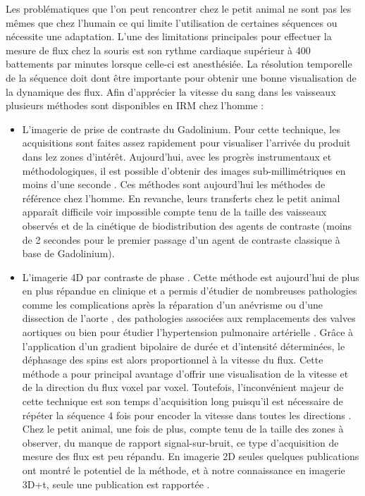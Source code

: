 Les problématiques que l'on peut rencontrer chez le petit animal ne sont pas les mêmes que chez l'humain ce qui limite l'utilisation de certaines séquences ou nécessite une adaptation. L'une des limitations principales pour effectuer la mesure de flux chez la souris est son rythme cardiaque supérieur à 400 battements par minutes lorsque celle-ci est anesthésiée. La résolution temporelle de la séquence doit dont être importante pour obtenir une bonne visualisation de la dynamique des flux. Afin d’apprécier la vitesse du sang dans les vaisseaux plusieurs méthodes sont disponibles en IRM chez l’homme : 
\begin{itemize}
\item L’imagerie de prise de contraste du Gadolinium. Pour cette technique, les acquisitions sont faites assez rapidement pour visualiser l’arrivée du produit dans lez zones d’intérêt. Aujourd’hui, avec les progrès instrumentaux et méthodologiques, il est possible d’obtenir des images sub-millimétriques en moins d’une seconde \cite{Wu:2011ys}. Ces méthodes sont aujourd’hui les méthodes de référence chez l’homme. En revanche, leurs transferts chez le petit animal apparaît difficile voir impossible compte tenu de la taille des vaisseaux observés et de la cinétique de biodistribution des agents de contraste (moins de 2 secondes pour le premier passage d’un agent de contraste classique à base de Gadolinium).

\item L’imagerie 4D par contraste de phase \cite{Markl:2012pi}. Cette méthode est aujourd’hui de plus en plus répandue en clinique et a permis d’étudier de nombreuses pathologies comme les complications après la réparation d'un anévrisme ou d'une dissection de l'aorte \cite{frydrychowicz2011aortic} , des pathologies associées aux remplacements des valves aortiques \cite{kvitting2004flow} ou bien pour étudier l'hypertension pulmonaire artérielle \cite{sanz2007pulmonary}.
Grâce à l’application d’un gradient bipolaire de durée et d’intensité déterminées, le déphasage des spins est alors proportionnel à la vitesse du flux. Cette méthode a pour principal avantage d’offrir une visualisation de la vitesse et de la direction du flux voxel par voxel. Toutefois, l’inconvénient majeur de cette technique est son temps d’acquisition long puisqu’il est nécessaire de répéter la séquence 4 fois pour encoder la vitesse dans toutes les directions \cite{Johnson:2010uq,Robson:2010uq,Wu:2013ys}. 
Chez le petit animal, une fois de plus, compte tenu de la taille des zones à observer, du manque de rapport signal-sur-bruit, ce type d’acquisition de mesure des flux est peu répandu. En imagerie 2D seules quelques publications ont montré le potentiel de la méthode, et à notre connaissance en imagerie 3D+t, seule une publication est rapportée \cite{Janiczek:2011qm}.


\end{itemize}
